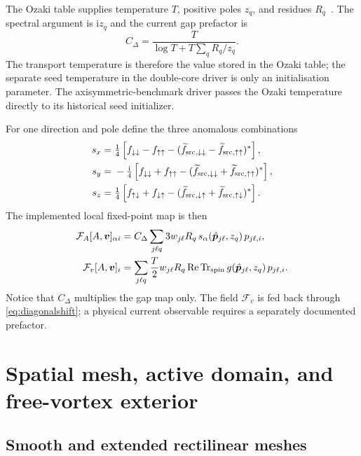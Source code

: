 \documentclass[11pt,a4paper]{article}
\newcommand{\ii}{\mathrm{i}}
\newcommand{\Tr}{\operatorname{Tr}}
\newcommand{\phat}{\hat{\bm p}}
\newcommand{\Fmap}{\mathcal{F}}
\begin{document}
The Ozaki table supplies temperature $T$, positive poles $z_q$, and residues
$R_q$~\cite{ozaki2007}.  The spectral argument is $\ii z_q$ and the current
gap prefactor is
\begin{equation}
  C_\Delta=
  \frac{T}{\log T+T\sum_q R_q/z_q}.
  \label{eq:ozaki-prefactor}
\end{equation}
The transport temperature is therefore the value stored in the Ozaki table;
the separate seed temperature in the double-core driver is only an
initialisation parameter. The axisymmetric-benchmark driver passes the Ozaki
temperature directly to its historical seed initializer.

For one direction and pole define the three anomalous combinations
\begin{align}
 s_x={}&\tfrac14\left[f_{\downarrow\downarrow}-f_{\uparrow\uparrow}
 -(\widetilde f_{{\rm src},\downarrow\downarrow}
   -\widetilde f_{{\rm src},\uparrow\uparrow})^*\right],\\
 s_y={}&-\tfrac{\ii}{4}\left[f_{\downarrow\downarrow}+f_{\uparrow\uparrow}
 -(\widetilde f_{{\rm src},\downarrow\downarrow}
   +\widetilde f_{{\rm src},\uparrow\uparrow})^*\right],\\
 s_z={}&\tfrac14\left[f_{\uparrow\downarrow}+f_{\downarrow\uparrow}
 -(\widetilde f_{{\rm src},\downarrow\uparrow}
   +\widetilde f_{{\rm src},\uparrow\downarrow})^*\right].
 \label{eq:spin-integrands}
\end{align}
The implemented local fixed-point map is then
\begin{align}
  \Fmap_A[A,\bm v]_{\alpha i}
  &=C_\Delta\sum_{j\ell q}
     3w_{j\ell}R_q\,s_\alpha(\phat_{j\ell},z_q)\,p_{j\ell,i},
     \label{eq:gapmap}\\
  \Fmap_v[A,\bm v]_i
  &=\sum_{j\ell q}\frac{T}{2}w_{j\ell}R_q
       \operatorname{Re}\Tr_{\rm spin}g(\phat_{j\ell},z_q)\,p_{j\ell,i}.
     \label{eq:currentmap}
\end{align}
Notice that $C_\Delta$ multiplies the gap map only.  The field
$\Fmap_v$ is fed back through \eqref{eq:diagonalshift}; a physical current
observable requires a separately documented prefactor.

\section{Spatial mesh, active domain, and free-vortex exterior}

\subsection{Smooth and extended rectilinear meshes}
\end{document}

